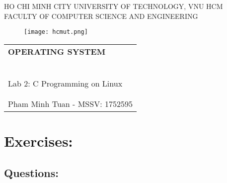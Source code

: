\documentclass[a4paper]{article}
\begin{document}
    \begin{titlepage}
        \begin{center}
            HO CHI MINH CITY UNIVERSITY OF TECHNOLOGY, VNU HCM \\
            FACULTY OF COMPUTER SCIENCE AND ENGINEERING
        \end{center}

        \vspace{1cm}

        \begin{figure}[h!]
            \begin{center}
                \texttt{[image: hcmut.png]}
            \end{center}
        \end{figure}

        \vspace{1cm}

        \begin{center}
            \begin{tabular}{c}
                \multicolumn{1}{l}{\textbf{\LARGE OPERATING SYSTEM}} \\
                ~~\\
                \hline
                \\
                \multicolumn{1}{l}{\LARGE Lab 2: C Programming on Linux} \\
                \\
                \hline
                \\
                \hspace{5cm} Pham Minh Tuan - MSSV: 1752595
            \end{tabular}
        \end{center}
    \end{titlepage}

\newpage

\section{\large Exercises: }
\subsection{\large Questions: }
\end{document}

